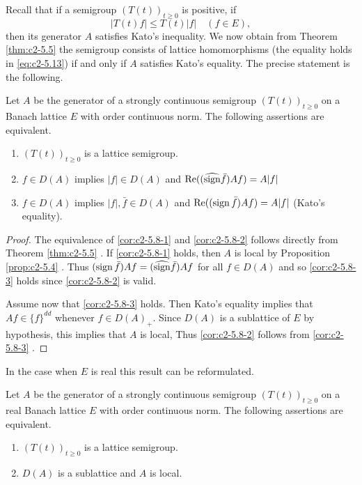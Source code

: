 Recall that if a semigroup $(T(t))_{t \geq 0}$ is positive, \ie if
\begin{equation}\label{eq:c2-5.13}
|T(t)f| \leq T(t) |f| \quad (f \in E) ,
\end{equation}
then its generator $A$ satisfies Kato's inequality. 
We now obtain from Theorem \ref{thm:c2-5.5} the semigroup consists of lattice homomorphisms (\ie the equality holds in \eqref{eq:c2-5.13}) if and only if $A$ satisfies Kato's equality. 
The precise statement is the following.

\begin{corollary}\label{cor:c2-5.8}
%
%
%
Let $A$ be the generator of a strongly continuous semigroup $(T(t))_{t \geq 0}$ on a Banach lattice $E$ with order continuous norm. 
The following assertions are equivalent.
\begin{enumerate}[\upshape (a)]
\item \label{cor:c2-5.8-1}
$(T(t))_{t \geq 0}$ is a lattice semigroup.
\item \label{cor:c2-5.8-2}
$f \in D(A)$ implies $|f| \in D(A)$ and $\mathop{}\!\mathrm{Re}((\widehat{\operatorname{sign}}  \bar{f})Af) = A|f|$ 
\item \label{cor:c2-5.8-3}
$f \in D(A)$ implies $|f|,\bar{f} \in D(A)$ and $\mathop{}\!\mathrm{Re}((\operatorname{sign}  \bar{f})Af) = A|f|$ 
(Kato's equality).
\end{enumerate}
\end{corollary}

\begin{proof}
The equivalence of \ref{cor:c2-5.8-1}   and \ref{cor:c2-5.8-2}   follows directly from Theorem \ref{thm:c2-5.5}  . 
If \ref{cor:c2-5.8-1}   holds, then $A$ is local by  Proposition \ref{prop:c2-5.4}  .
Thus $(\operatorname{sign}  \bar{f})Af = (\widehat{\operatorname{sign}}  \bar{f})Af$ for all $f \in D(A)$ and so \ref{cor:c2-5.8-3}   holds since \ref{cor:c2-5.8-2}   is valid.

Assume now that \ref{cor:c2-5.8-3}   holds. 
Then Kato's equality implies that $Af \in \{f\}^{dd}$ whenever $f \in D(A)_{+}$. 
Since $D(A)$ is a sublattice of $E$ by hypothesis, this implies that $A$ is local, Thus \ref{cor:c2-5.8-2}   follows from \ref{cor:c2-5.8-3}   .
\end{proof}

In the case when $E$ is real this result can be reformulated.

\begin{corollary}\label{cor:c2-5.9}
%
%
Let $A$ be the generator of a strongly continuous semigroup $(T(t))_{t \geq 0}$ on a real Banach lattice $E$ with order continuous norm. 
The following assertions are equivalent.
\begin{enumerate}[\upshape (a)]
\item \label{cor:c2-5.9-1}
$(T(t))_{t \geq 0}$ is a lattice semigroup.
\item \label{cor:c2-5.9-2}
$D(A)$ is a sublattice and $A$ is local.
\end{enumerate}
\end{corollary}

